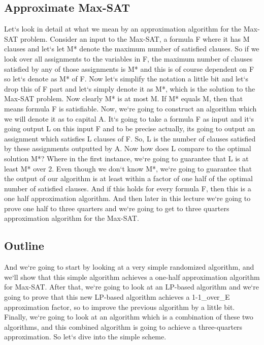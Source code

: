 \subsection{Approximate Max-SAT}
Let`s look in detail at what we mean by an approximation algorithm for the Max-SAT problem.
Consider an input to the Max-SAT, a formula F where it has M clauses and let`s let M* denote the maximum number of satisfied clauses.
So if we look over all assignments to the variables in F, the maximum number of clauses satisfied by any of those assignments is M* and this is of course dependent on F so let`s denote as M* of F\@.
Now let`s simplify the notation a little bit and let`s drop this of F part and let`s simply denote it as M*, which is the solution to the Max-SAT problem.
Now clearly M* is at most M\@.
If M* equals M, then that means formula F is satisfiable.
Now, we`re going to construct an algorithm which we will denote it as to capital A\@.
It`s going to take a formula F as input and it`s going output L on this input F and to be precise actually, its going to output an assignment which satisfies L clauses of F\@.
So, L is the number of clauses satisfied by these assignments outputted by A\@.
Now how does L compare to the optimal solution M*? Where in the first instance, we`re going to guarantee that L is at least M* over 2.
Even though we don`t know M*, we`re going to guarantee that the output of our algorithm is at least within a factor of one half of the optimal number of satisfied clauses.
And if this holds for every formula F, then this is a one half approximation algorithm.
And then later in this lecture we`re going to prove one half to three quarters and we`re going to get to three quarters approximation algorithm for the Max-SAT\@.

\subsection{Outline}
And we`re going to start by looking at a very simple randomized algorithm, and we`ll show that this simple algorithm achieves a one-half approximation algorithm for Max-SAT\@.
After that, we`re going to look at an LP-based algorithm and we`re going to prove that this new LP-based algorithm achieves a 1-1\_over\_E approximation factor, so to improve the previous algorithm by a little bit.
Finally, we`re going to look at an algorithm which is a combination of these two algorithms, and this combined algorithm is going to achieve a three-quarters approximation.
So let`s dive into the simple scheme.

